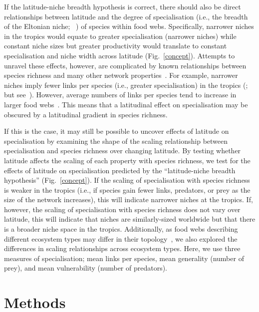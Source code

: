 \documentclass[12pt]{article}
\begin{document}
  If the latitude-niche breadth hypothesis is correct, there should also be
  direct relationships between latitude and the degree of specialisation
  (i.e., the breadth of the Eltonian niche; ~\cite{Elton1927,Leibold2010}) of
  species within food webs. Specifically, narrower niches in the tropics would
  equate to greater specialisation (narrower niches) while constant niche
  sizes but greater productivity would translate to constant specialisation
  and niche width across latitude (Fig.~\ref{concept}). Attempts to unravel
  these effects, however, are complicated by known relationships between
  species richness and many other network properties~\cite{Riede2010}.  For
  example, narrower niches imply fewer links per species (i.e., greater
  specialisation) in the tropics (\cite{Marra1997,Dyer2007}; but
  see~\cite{Schleuning2012}). However, average numbers of links per species
  tend to increase in larger food webs~\cite{Dunne2006,Riede2010}. This means
  that a latitudinal effect on specialisation may be obscured by a latitudinal
  gradient in species richness.


  If this is the case, it may still be possible to uncover effects of latitude
  on specialisation by examining the shape of the scaling relationship between
  specialisation and species richness over changing latitude.  By testing
  whether latitude affects the scaling of each property with species richness,
  we test for the effects of latitude on specialisation predicted by the
  ``latitude-niche breadth hypothesis'' (Fig.~\ref{concept}).  If the scaling
  of specialisation with species richness is weaker in the  tropics (i.e., if
  species gain fewer links, predators, or prey as the size  of the network
  increases), this will indicate narrower niches at the tropics.  If, however,
  the scaling of specialisation with species richness does not  vary over
  latitude, this will indicate that niches are similarly-sized worldwide but
  that there is a broader niche space in the tropics. Additionally, as food
  webs describing different ecosystem types may differ in their
  topology~\cite{Dunne2004,Shurin2006}, we also explored the differences in
  scaling relationships across ecosystem types. Here, we use three measures of
  specialisation; mean links per species, mean generality (number of prey),
  and mean vulnerability (number of predators).


\section*{Methods}
\end{document}

